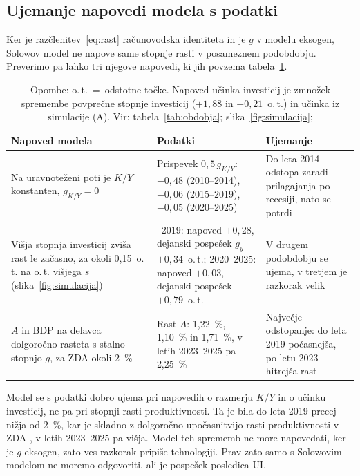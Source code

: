 \documentclass[12pt,a4paper]{article}
\begin{document}
\subsection{Ujemanje napovedi modela s podatki}\label{sec:ujemanje}
Ker je razčlenitev~\eqref{eq:rast} računovodska identiteta in je $g$ v modelu eksogen, Solowov model ne napove same stopnje rasti v posameznem podobdobju. Preverimo pa lahko tri njegove napovedi, ki jih povzema tabela~\ref{tab:ujemanje}.

\begin{table}[H]
\centering
\caption{Napovedi Solowovega modela in podatki za ZDA}\label{tab:ujemanje}
\footnotesize
\renewcommand{\arraystretch}{1.15}
\begin{tabularx}{\textwidth}{>{\raggedright\arraybackslash}p{4.4cm} >{\raggedright\arraybackslash}X >{\raggedright\arraybackslash}p{4.0cm}}
\toprule
\textbf{Napoved modela} & \textbf{Podatki} & \textbf{Ujemanje} \\
\midrule
Na uravnoteženi poti je $K/Y$ konstanten, $g_{K/Y}=0$ \parencite[pros.~77]{grobovsek2026} & Prispevek $0{,}5\,g_{K/Y}$: $-0{,}48$ (2010--2014), $-0{,}06$ (2015--2019), $-0{,}05$ (2020--2025) & Do leta 2014 odstopa zaradi prilagajanja po recesiji, nato se potrdi \\
\addlinespace
Višja stopnja investicij zviša rast le začasno, za okoli 0,15~o.\,t. na o.\,t. višjega $s$ (slika~\ref{fig:simulacija}) & 2015--2019: napoved $+0{,}28$, dejanski pospešek $g_y$ $+0{,}34$~o.\,t.; 2020--2025: napoved $+0{,}03$, dejanski pospešek $+0{,}79$~o.\,t. & V drugem podobdobju se ujema, v tretjem je razkorak velik \\
\addlinespace
$A$ in BDP na delavca dolgoročno rasteta s stalno stopnjo $g$, za ZDA okoli 2~\% \parencites[pros.~59]{grobovsek2026}[str.~18]{polanec_rast} & Rast $A$: 1,22~\%, 1,10~\% in 1,71~\%, v letih 2023--2025 pa 2,25~\% & Največje odstopanje: do leta 2019 počasnejša, po letu 2023 hitrejša rast \\
\bottomrule
\end{tabularx}
\caption*{\footnotesize Opombe: o.\,t.~=~odstotne točke. Napoved učinka investicij je zmnožek spremembe povprečne stopnje investicij ($+1{,}88$ in $+0{,}21$~o.\,t.) in učinka iz simulacije (A). Vir: tabela~\ref{tab:obdobja}; slika~\ref{fig:simulacija}; \cite{fredinv}}
\end{table}

Model se s podatki dobro ujema pri napovedih o razmerju $K/Y$ in o učinku investicij, ne pa pri stopnji rasti produktivnosti. Ta je bila do leta 2019 precej nižja od 2~\%, kar je skladno z dolgoročno upočasnitvijo rasti produktivnosti v ZDA \parencite[str.~129]{garin2021}, v letih 2023--2025 pa višja. Model teh sprememb ne more napovedati, ker je $g$ eksogen, zato ves razkorak pripiše tehnologiji. Prav zato samo s Solowovim modelom ne moremo odgovoriti, ali je pospešek posledica UI.
\end{document}
